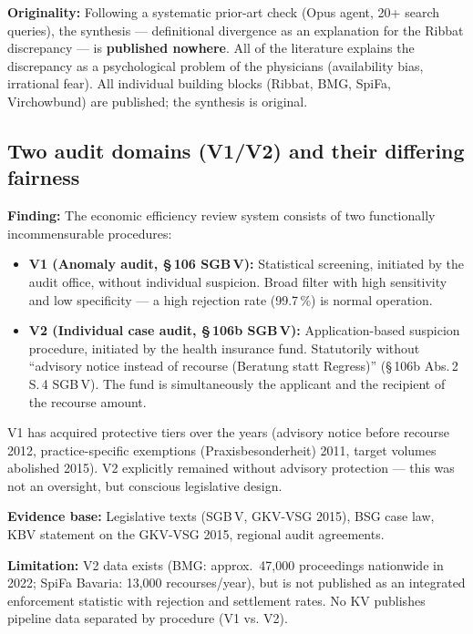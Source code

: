\documentclass{umbruch-position}
\providecommand{\textgerman}[1]{#1}
\begin{document}
\textbf{Originality:} Following a systematic prior-art check (Opus agent, 20+ search queries), the synthesis --- definitional divergence as an explanation for the Ribbat discrepancy --- is \textbf{published nowhere}. All of the literature explains the discrepancy as a psychological problem of the physicians (availability bias, irrational fear). All individual building blocks (Ribbat, BMG, SpiFa, Virchowbund) are published; the synthesis is original.

\subsection{Two audit domains (V1/V2) and their differing fairness}

\textbf{Finding:} The economic efficiency review system consists of two functionally incommensurable procedures:

\begin{itemize}
  \item \textbf{V1 (Anomaly audit, \S\,106 SGB\,V):} Statistical screening, initiated by the audit office, without individual suspicion. Broad filter with high sensitivity and low specificity --- a high rejection rate (99.7\,\%) is normal operation.
  \item \textbf{V2 (Individual case audit, \S\,106b SGB\,V):} Application-based suspicion procedure, initiated by the health insurance fund. Statutorily without ``advisory notice instead of recourse (\textgerman{Beratung statt Regress})'' (\S\,106b Abs.\,2 S.\,4 SGB\,V). The fund is simultaneously the applicant and the recipient of the recourse amount.
\end{itemize}

V1 has acquired protective tiers over the years (advisory notice before recourse 2012, practice-specific exemptions (\textgerman{Praxisbesonderheit}) 2011, target volumes abolished 2015). V2 explicitly remained without advisory protection --- this was not an oversight, but conscious legislative design.

\textbf{Evidence base:} Legislative texts (SGB\,V, GKV-VSG 2015), BSG case law, KBV statement on the GKV-VSG 2015, regional audit agreements.

\textbf{Limitation:} V2 data exists (BMG: approx.\ 47,000 proceedings nationwide in 2022; SpiFa Bavaria: 13,000 recourses/year), but is not published as an integrated enforcement statistic with rejection and settlement rates. No KV publishes pipeline data separated by procedure (V1 vs. V2).
\end{document}
